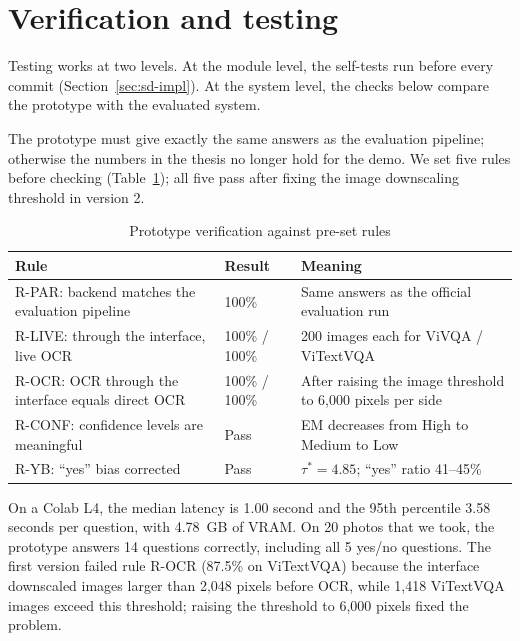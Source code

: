 \section{Verification and testing}
\label{sec:res-proto}

Testing works at two levels. At the module level, the self-tests run before every commit
(Section~\ref{sec:sd-impl}). At the system level, the checks below compare the prototype
with the evaluated system.

The prototype must give exactly the same answers as the evaluation pipeline; otherwise the
numbers in the thesis no longer hold for the demo. We set five rules before checking
(Table~\ref{tab:res-proto}); all five pass after fixing the image downscaling threshold in
version 2.

\begin{table}[htbp]
\caption{Prototype verification against pre-set rules}
\label{tab:res-proto}
\centering
\small
\begin{tabular}{p{}p{}p{}}
\toprule
\raggedright \textbf{Rule} & \raggedright \textbf{Result} & \raggedright \textbf{Meaning} \tabularnewline
\midrule
\raggedright R-PAR: backend matches the evaluation pipeline & \raggedright 100\% & \raggedright Same answers as the official evaluation run \tabularnewline
\raggedright R-LIVE: through the interface, live OCR & \raggedright 100\% / 100\% & \raggedright 200 images each for ViVQA / ViTextVQA \tabularnewline
\raggedright R-OCR: OCR through the interface equals direct OCR & \raggedright 100\% / 100\% & \raggedright After raising the image threshold to 6,000 pixels per side \tabularnewline
\raggedright R-CONF: confidence levels are meaningful & \raggedright Pass & \raggedright EM decreases from High to Medium to Low \tabularnewline
\raggedright R-YB: ``yes'' bias corrected & \raggedright Pass & \raggedright $\tau^* = 4.85$; ``yes'' ratio 41--45\% \tabularnewline
\bottomrule
\end{tabular}
\end{table}

On a Colab L4, the median latency is 1.00 second and the 95th percentile 3.58 seconds per
question, with 4.78~GB of VRAM. On 20 photos that we took, the prototype answers 14
questions correctly, including all 5 yes/no questions. The first version failed rule R-OCR
(87.5\% on ViTextVQA) because the interface downscaled images larger than 2,048 pixels
before OCR, while 1,418 ViTextVQA images exceed this threshold; raising the threshold to
6,000 pixels fixed the problem.

